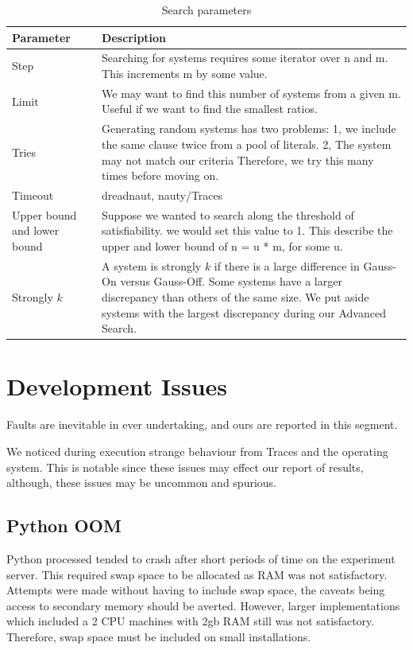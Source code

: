 \begin{table}[h]
	\centering
	\label{tab:parm}
	\begin{tabular}{p{2cm}| p{11cm}}
		\toprule
		Parameter & Description \\
		\midrule
		Step & Searching for systems requires some iterator over n and m. This increments m by some value. \\ \hline
		Limit &  We may want to find this number of systems from a given m. Useful if we want to find the smallest ratios. \\ \hline
		Tries & Generating random systems has two problems: 1, we include the same clause twice from a pool of literals. 2, The system may not match our criteria Therefore, we try this many times before moving on.\\ \hline
		Timeout & dreadnaut, nauty/Traces \\ \hline
		Upper bound and lower bound & Suppose we wanted to search along the threshold of satisfiability. we would set this value to 1. This describe the upper and lower bound of n = u * m, for some u.\\ \hline
		Strongly $k$ & A system is strongly $k$ if there is a large difference in Gauss-On versus Gauss-Off. Some systems have a larger discrepancy than others of the same size. We put aside systems with the largest discrepancy during our Advanced Search. \\ \hline
		\bottomrule
	\end{tabular}
	\caption{Search parameters}
\end{table}
\newpage
\section{Development Issues}
Faults are inevitable in ever undertaking, and ours are reported in this segment.
\par
We noticed during execution strange behaviour from Traces and the operating system. This is notable  since these issues may effect our report of results, although, these issues may be uncommon and spurious. 

\subsection{Python OOM}
Python processed tended to crash after short periods of time on the experiment server. This required swap space to be allocated as RAM was not satisfactory. Attempts were made without having to include swap space, the caveats being access to secondary memory should be averted. However, larger implementations which included a 2 CPU machines with 2gb RAM still was not satisfactory. Therefore, swap space must be included on small installations. 

